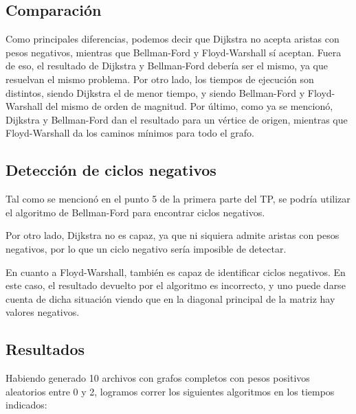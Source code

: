 \documentclass[a4paper,10pt]{article}
\begin{document}
\subsection{Comparación}
	Como principales diferencias, podemos decir que Dijkstra no acepta aristas con pesos negativos, mientras que Bellman-Ford y Floyd-Warshall sí aceptan. Fuera de eso, el resultado de Dijkstra y Bellman-Ford debería ser el mismo, ya que resuelvan el mismo problema. Por otro lado, los tiempos de ejecución son distintos, siendo Dijkstra el de menor tiempo, y siendo Bellman-Ford y Floyd-Warshall del mismo de orden de magnitud. Por último, como ya se mencionó, Dijkstra y Bellman-Ford dan el resultado para un vértice de origen, mientras que Floyd-Warshall da los caminos mínimos para todo el grafo.

\subsection{Detección de ciclos negativos}
	Tal como se mencionó en el punto 5 de la primera parte del TP, se podría utilizar el algoritmo de Bellman-Ford para encontrar ciclos negativos.

	Por otro lado, Dijkstra no es capaz, ya que ni siquiera admite aristas con pesos negativos, por lo que un ciclo negativo sería imposible de detectar.

	En cuanto a Floyd-Warshall, también es capaz de identificar ciclos negativos. En este caso, el resultado devuelto por el algoritmo es incorrecto, y uno puede darse cuenta de dicha situación viendo que en la diagonal principal de la matriz hay valores negativos.

\subsection{Resultados}
	Habiendo generado 10 archivos con grafos completos con pesos positivos aleatorios entre 0 y 2, logramos correr los siguientes algoritmos en los tiempos indicados:
\end{document}
